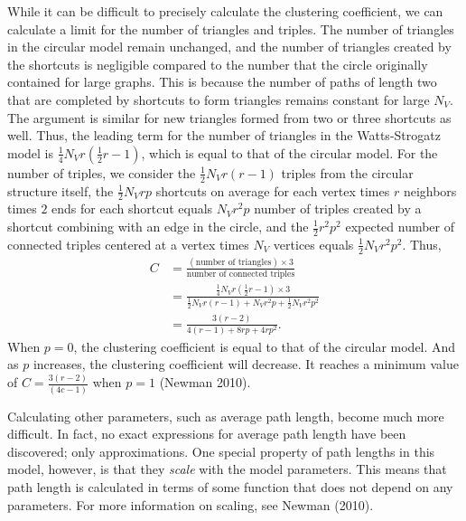 \documentclass[12pt,twoside]{amherstthesis}
\begin{document}
  While it can be difficult to precisely calculate the clustering
  coefficient, we can calculate a limit for the number of triangles and
  triples. The number of triangles in the circular model remain unchanged,
  and the number of triangles created by the shortcuts is negligible
  compared to the number that the circle originally contained for large
  graphs. This is because the number of paths of length two that are
  completed by shortcuts to form triangles remains constant for large
  \(N_{V}\). The argument is similar for new triangles formed from two or
  three shortcuts as well. Thus, the leading term for the number of
  triangles in the Watts-Strogatz model is
  \(\frac {1} {4} N_{V}r \left(\frac {1} {2} r - 1 \right)\), which is
  equal to that of the circular model. For the number of triples, we
  consider the \(\frac {1} {2} N_{V} r(r - 1)\) triples from the circular
  structure itself, the \(\frac {1} {2}N_{V}rp\) shortcuts on average for
  each vertex times \(r\) neighbors times \(2\) ends for each shortcut
  equals \(N_{V}r^{2}p\) number of triples created by a shortcut combining
  with an edge in the circle, and the \(\frac {1} {2} r^{2} p^2\) expected
  number of connected triples centered at a vertex times \(N_{V}\)
  vertices equals \(\frac {1} {2} N_{V} r^{2} p^2\). Thus, \[
  \begin{aligned}
  C &= \frac {(\text{number of triangles}) \times 3} {\text{number of connected triples}}  \\
  &= \frac {\frac {1} {4} N_{V} r \left(\frac {1} {2} r - 1 \right) \times 3} {\frac {1} {2} N_{V} r(r - 1) + N_{V}r^{2}p + \frac {1} {2} N_{V} r^{2} p^2} \\
  &= \frac{3(r - 2)} {4(r - 1)+8rp + 4rp^{2}}.
  \end{aligned}
  \] When \(p = 0\), the clustering coefficient is equal to that of the
  circular model. And as \(p\) increases, the clustering coefficient will
  decrease. It reaches a minimum value of
  \(C = \frac {3(r - 2)} {(4c - 1)}\) when \(p = 1\) (Newman 2010).
  
  Calculating other parameters, such as average path length, become much
  more difficult. In fact, no exact expressions for average path length
  have been discovered; only approximations. One special property of path
  lengths in this model, however, is that they \emph{scale} with the model
  parameters. This means that path length is calculated in terms of some
  function that does not depend on any parameters. For more information on
  scaling, see Newman (2010).
  
\end{document}

